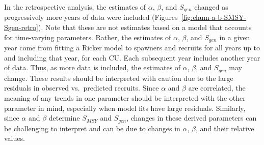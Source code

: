 \documentclass[11pt]{book}
\begin{document}
In the retrospective analysis, the estimates of \(\alpha\), \(\beta\), and \(S_{gen}\) changed as progressively more years of data were included (Figures~\ref{fig:chum-a-b-SMSY-Sgen-retro}). Note that these are not estimates based on a model that accounts for time-varying parameters. Rather, the estimates of \(\alpha\), \(\beta\), and \(S_{gen}\) in a given year come from fitting a Ricker model to spawners and recruits for all years up to and including that year, for each CU. Each subsequent year includes another year of data. Thus, as more data is included, the estimates of \(\alpha\), \(\beta\), and \(S_{gen}\) may change. These results should be interpreted with caution due to the large residuals in observed vs.~predicted recruits. Since \(\alpha\) and \(\beta\) are correlated, the meaning of any trends in one parameter should be interpreted with the other parameter in mind, especially when model fits have large residuals. Similarly, since \(\alpha\) and \(\beta\) determine \(S_{MSY}\) and \(S_{gen}\), changes in these derived parameters can be challenging to interpret and can be due to changes in \(\alpha\), \(\beta\), and their relative values.
\end{document}
